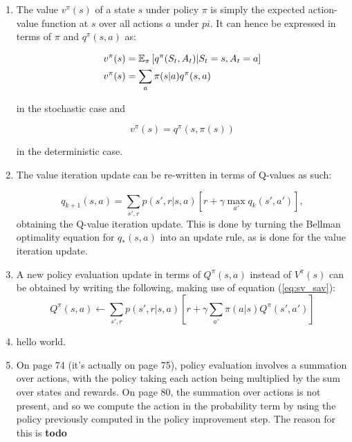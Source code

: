 \documentclass[
]{article}
\begin{document}
\begin{enumerate}
\def\labelenumi{\arabic{enumi}.}
\item
  The value \(v^\pi(s)\) of a state \(s\) under policy \(\pi\) is simply
  the expected action-value function at \(s\) over all actions \(a\)
  under \(pi\). It can hence be expressed in terms of \(\pi\) and
  \(q^\pi(s, a)\) as:

  \begin{align}
     v^\pi(s) &= \mathbb{E}_\pi\left[q^\pi(S_t, A_t) | S_t = s, A_t=a\right]\notag\\ 
     v^\pi(s) &= \sum_a \pi(s|a) q^\pi(s, a) \label{eq:sv_sav}
  \end{align}

  in the stochastic case and

  \begin{equation}
     v^\pi(s) =  q^\pi(s, \pi(s))
  \end{equation}

  in the deterministic case.

\item
  The value iteration update can be re-written in terms of Q-values as such:
  
  \begin{equation}
    q_{k+1}(s, a) = \sum_{s', r} p(s', r | s, a)\left[r + \gamma \max_{a'} q_k(s', a')\right],
  \end{equation}
  obtaining the Q-value iteration update. This is done by turning the Bellman optimality equation
  for $q_*(s, a)$ into an update rule, as is done for the value iteration update.

\item
  A new policy evaluation update in terms of $Q^\pi(s, a)$ instead of $V^\pi(s)$ can be obtained by
  writing the following, making use of equation (\ref{eq:sv_sav}):
  \begin{equation}
    Q^\pi(s, a) \leftarrow \sum_{s', r} p(s', r| s, a)\left[r + \gamma \sum_{a'}\pi(a|s)Q^\pi(s', a')\right]
  \end{equation}
\item
  hello world.
\item
  On page 74 (it's actually on page 75), policy evaluation involves a summation over actions, with
  the policy taking each action being multiplied by the sum over states and rewards. On page 80, the summation
  over actions is not present, and so we compute the action in the probability term by using the
  policy previously computed in the policy improvement step. The reason for this is \textbf{todo}
\end{enumerate}
\end{document}
